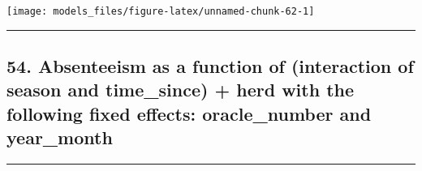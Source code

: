 \documentclass[]{article}
\begin{document}
\begin{center}\texttt{[image: models\_files/figure-latex/unnamed-chunk-62-1]} \end{center}

\newpage

\begin{center}\rule{0.5\linewidth}{\linethickness}\end{center}

\subsection{54. Absenteeism as a function of (interaction of season and
time\_since) + herd with the following fixed effects: oracle\_number and
year\_month}\label{absenteeism-as-a-function-of-interaction-of-season-and-time_since-herd-with-the-following-fixed-effects-oracle_number-and-year_month}

\begin{center}\rule{0.5\linewidth}{\linethickness}\end{center}
\end{document}
